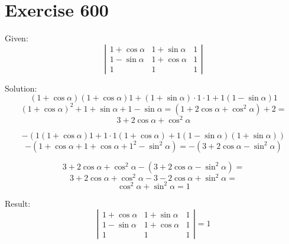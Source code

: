 \documentclass[a4paper, 10pt]{scrartcl}
\begin{document}
\section{Exercise 600}

Given:
\[
\left|
    \begin{array}{ccc}
        1 + \cos{\alpha} & 1 + \sin{\alpha} & 1\\
        1 - \sin{\alpha} & 1 + \cos{\alpha} & 1\\
        1 & 1 & 1
    \end{array}
\right|
\]

Solution:
\[
(1 + \cos{\alpha})(1 + \cos{\alpha})1 + (1 + \sin{\alpha})\cdot1\cdot1 + 1(1 - \sin{\alpha})1
\]
\[
(1 + \cos{\alpha})^{2} + 1 + \sin{\alpha} + 1 - \sin{\alpha} = (1 + 2\cos{\alpha} + \cos^{2}{\alpha}) + 2 =
\]
\[
3 + 2\cos{\alpha} + \cos^{2}{\alpha}
\]

\[
-(1(1 + \cos{\alpha})1 + 1\cdot1(1 + \cos{\alpha}) + 1(1 - \sin{\alpha})(1 + \sin{\alpha}))
\]
\[
-(1 + \cos{\alpha} + 1 + \cos{\alpha} + 1^{2} - \sin^{2}{\alpha}) =
-(3 + 2\cos{\alpha} - \sin^{2}{\alpha})
\]

\[
3 + 2\cos{\alpha} + \cos^{2}{\alpha} - (3 + 2\cos{\alpha} - \sin^{2}{\alpha}) =
\]
\[
3 + 2\cos{\alpha} + \cos^{2}{\alpha} - 3 - 2\cos{\alpha} + \sin^{2}{\alpha} =
\]
\[
\cos^{2}{\alpha} + \sin^{2}{\alpha} = 1
\]

Result:
\[
\left|
    \begin{array}{ccc}
        1 + \cos{\alpha} & 1 + \sin{\alpha} & 1\\
        1 - \sin{\alpha} & 1 + \cos{\alpha} & 1\\
        1 & 1 & 1
    \end{array}
\right| = 1
\]
\end{document}
